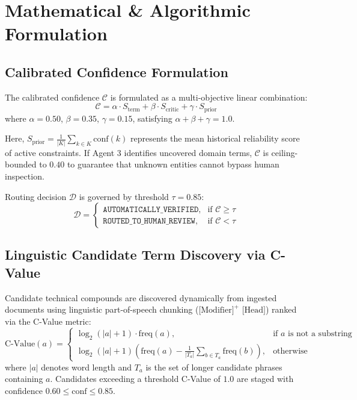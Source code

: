 \documentclass[conference]{IEEEtran}
\begin{document}
\section{Mathematical \& Algorithmic Formulation}

\subsection{Calibrated Confidence Formulation}
The calibrated confidence $\mathcal{C}$ is formulated as a multi-objective linear combination:
\begin{equation}
\mathcal{C} = \alpha \cdot S_{\text{term}} + \beta \cdot S_{\text{critic}} + \gamma \cdot S_{\text{prior}}
\end{equation}
where $\alpha = 0.50$, $\beta = 0.35$, $\gamma = 0.15$, satisfying $\alpha + \beta + \gamma = 1.0$.

Here, $S_{\text{prior}} = \frac{1}{|K|} \sum_{k \in K} \text{conf}(k)$ represents the mean historical reliability score of active constraints. If Agent 3 identifies uncovered domain terms, $\mathcal{C}$ is ceiling-bounded to $0.40$ to guarantee that unknown entities cannot bypass human inspection.

Routing decision $\mathcal{D}$ is governed by threshold $\tau = 0.85$:
\begin{equation}
\mathcal{D} = 
\begin{cases}
\texttt{AUTOMATICALLY\_VERIFIED}, & \text{if } \mathcal{C} \ge \tau \\
\texttt{ROUTED\_TO\_HUMAN\_REVIEW}, & \text{if } \mathcal{C} < \tau
\end{cases}
\end{equation}

\subsection{Linguistic Candidate Term Discovery via C-Value}
Candidate technical compounds are discovered dynamically from ingested documents using linguistic part-of-speech chunking ($\text{[Modifier]}^+ \text{ [Head]}$) ranked via the C-Value metric:
\begin{equation}
\text{C-Value}(a) = 
\begin{cases}
\log_2(|a| + 1) \cdot \text{freq}(a), & \text{if } a \text{ is not a substring} \\
\log_2(|a| + 1) \left(\text{freq}(a) - \frac{1}{|T_a|} \sum_{b \in T_a} \text{freq}(b)\right), & \text{otherwise}
\end{cases}
\end{equation}
where $|a|$ denotes word length and $T_a$ is the set of longer candidate phrases containing $a$. Candidates exceeding a threshold C-Value of $1.0$ are staged with confidence $0.60 \le \text{conf} \le 0.85$.
\end{document}
